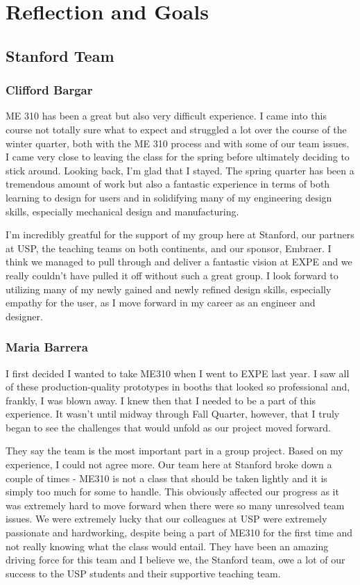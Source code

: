 \section{Reflection and Goals}

\subsection{Stanford Team}

\subsubsection{Clifford Bargar}

ME 310 has been a great but also very difficult experience. I came into this course not totally sure what to expect and struggled a lot over the course of the winter quarter, both with the ME 310 process and with some of our team issues. I came very close to leaving the class for the spring before ultimately deciding to stick around. Looking back, I'm glad that I stayed. The spring quarter has been a tremendous amount of work but also a fantastic experience in terms of both learning to design for users and in solidifying many of my engineering design skills, especially mechanical design and manufacturing.

I'm incredibly greatful for the support of my group here at Stanford, our partners at USP, the teaching teams on both continents, and our sponsor, Embraer. I think we managed to pull through and deliver a fantastic vision at EXPE and we really couldn't have pulled it off without such a great group. I look forward to utilizing many of my newly gained and newly refined design skills, especially empathy for the user, as I move forward in my career as an engineer and designer.

\subsubsection{Maria Barrera}
I first decided I wanted to take ME310 when I went to EXPE last year. I saw all of these production-quality prototypes in booths that looked so professional and, frankly, I was blown away. I knew then that I needed to be a part of this experience. It wasn't until midway through Fall Quarter, however, that I truly began to see the challenges that would unfold as our project moved forward.

They say the team is the most important part in a group project. Based on my experience, I could not agree more. Our team here at Stanford broke down a couple of times - ME310 is not a class that should be taken lightly and it is simply too much for some to handle. This obviously affected our progress as it was extremely hard to move forward when there were so many unresolved team issues. We were extremely lucky that our colleagues at USP were extremely passionate and hardworking, despite being a part of ME310 for the first time and not really knowing what the class would entail. They have been an amazing driving force for this team and I believe we, the Stanford team, owe a lot of our success to the USP students and their supportive teaching team.

